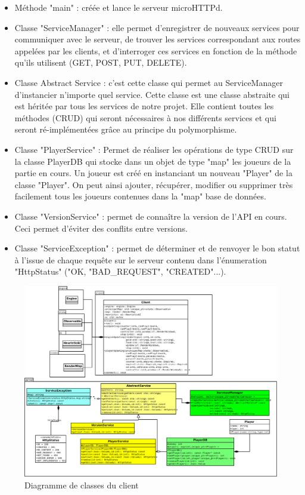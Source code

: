 \documentclass[12pt,a4paper]{article}
\begin{document}
\begin{itemize}
    \item Méthode "main" : créée et lance le serveur microHTTPd.
    \item Classe "ServiceManager" : elle permet d'enregistrer de nouveaux services pour communiquer avec le serveur, de trouver les services correspondant aux routes appelées par les clients, et d'interroger ces services en fonction de la méthode qu'ils utilisent (GET, POST, PUT, DELETE).
    \item Classe Abstract Service : c'est cette classe qui permet au ServiceManager d'instancier n'importe quel service. Cette classe est une classe abstraite qui est héritée par tous les services de notre projet. Elle contient toutes les méthodes (CRUD) qui seront nécessaires à nos différents services et qui seront ré-implémentées grâce au principe du polymorphisme.  
    \item Classe "PlayerService" : Permet de réaliser les opérations de type CRUD sur la classe PlayerDB qui stocke dans un objet de type "map" les joueurs de la partie en cours. Un joueur est créé en instanciant un nouveau "Player" de la classe "Player". On peut ainsi ajouter, récupérer, modifier ou supprimer très facilement tous les joueurs contenues dans la "map" base de données.
    \item Classe "VersionService" : permet de connaître la version de l'API en cours. Ceci permet d'éviter des conflits entre versions. 
    \item Classe "ServiceException" : permet de déterminer et de renvoyer le bon statut à l'issue de chaque requête sur le serveur contenu dans l'énumeration "HttpStatus" ("OK, "BAD\_REQUEST", "CREATED"...).
\end{itemize}

\begin{figure}[!ht]
\centering
    \includegraphics[width=1\textwidth]{ressources/module.png}
     \caption{Diagramme de classes du client}
\end{figure}
\end{document}
